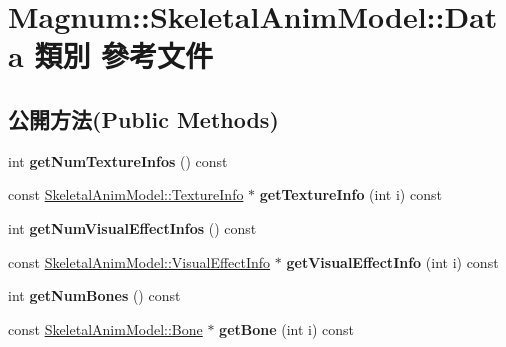 \hypertarget{class_magnum_1_1_skeletal_anim_model_1_1_data}{}\section{Magnum\+:\+:Skeletal\+Anim\+Model\+:\+:Data 類別 參考文件}
\label{class_magnum_1_1_skeletal_anim_model_1_1_data}
\subsection*{公開方法(Public Methods)}
\begin{DoxyCompactItemize}
\item 
int {\bfseries get\+Num\+Texture\+Infos} () const \hypertarget{class_magnum_1_1_skeletal_anim_model_1_1_data_a274da0d2b82a7b7416dd92472077eb25}{}\label{class_magnum_1_1_skeletal_anim_model_1_1_data_a274da0d2b82a7b7416dd92472077eb25}

\item 
const \hyperlink{class_magnum_1_1_skeletal_anim_model_1_1_texture_info}{Skeletal\+Anim\+Model\+::\+Texture\+Info} $\ast$ {\bfseries get\+Texture\+Info} (int i) const \hypertarget{class_magnum_1_1_skeletal_anim_model_1_1_data_ac38040762e4bbe85bc30382ebe1a644e}{}\label{class_magnum_1_1_skeletal_anim_model_1_1_data_ac38040762e4bbe85bc30382ebe1a644e}

\item 
int {\bfseries get\+Num\+Visual\+Effect\+Infos} () const \hypertarget{class_magnum_1_1_skeletal_anim_model_1_1_data_a93f1f5f7bdccf5e3d65f9f9d84bae543}{}\label{class_magnum_1_1_skeletal_anim_model_1_1_data_a93f1f5f7bdccf5e3d65f9f9d84bae543}

\item 
const \hyperlink{class_magnum_1_1_skeletal_anim_model_1_1_visual_effect_info}{Skeletal\+Anim\+Model\+::\+Visual\+Effect\+Info} $\ast$ {\bfseries get\+Visual\+Effect\+Info} (int i) const \hypertarget{class_magnum_1_1_skeletal_anim_model_1_1_data_ad96a4ee48f0aeb385a07a86b42428f62}{}\label{class_magnum_1_1_skeletal_anim_model_1_1_data_ad96a4ee48f0aeb385a07a86b42428f62}

\item 
int {\bfseries get\+Num\+Bones} () const \hypertarget{class_magnum_1_1_skeletal_anim_model_1_1_data_abaed50446079eda99ba99fc6c658285c}{}\label{class_magnum_1_1_skeletal_anim_model_1_1_data_abaed50446079eda99ba99fc6c658285c}

\item 
const \hyperlink{class_magnum_1_1_skeletal_anim_model_1_1_bone}{Skeletal\+Anim\+Model\+::\+Bone} $\ast$ {\bfseries get\+Bone} (int i) const \hypertarget{class_magnum_1_1_skeletal_anim_model_1_1_data_a5606e39a25d0114d53805303b3b36457}{}\label{class_magnum_1_1_skeletal_anim_model_1_1_data_a5606e39a25d0114d53805303b3b36457}


\end{DoxyCompactItemize}
